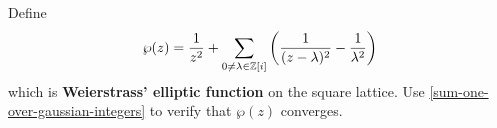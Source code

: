 \documentclass{homework}
\begin{document}
                                                                                                        \begin{problem}
                                                                                                          Define
                                                                                                            \[
                                                                                                                \wp(z) = \frac{1}{z^2} + \sum_{0 \neq \lambda \in \mathbb{Z}[i]} \left( \frac{1}{(z - \lambda)^2} - \frac{1}{\lambda^2} \right)
                                                                                                                  \]
                                                                                                                    which is \textbf{Weierstrass' elliptic function} on the square lattice.  Use \ref{sum-one-over-gaussian-integers} to verify that $\wp(z)$ converges.
                                                                                                                    \end{problem}
\end{document}

